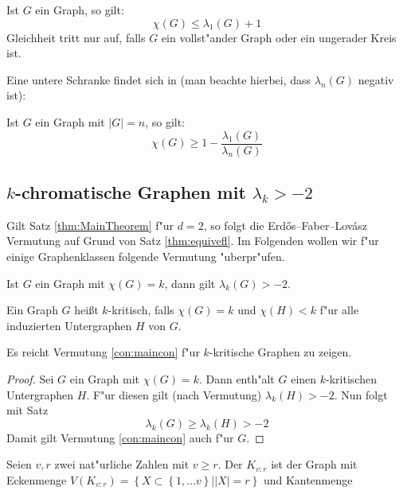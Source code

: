 \begin{theorem}
  Ist $G$ ein Graph, so gilt: 
  $$\chi(G) \leq \lambda_{1}(G) +1$$
  Gleichheit tritt nur auf, falls $G$ ein vollst"ander Graph oder ein ungerader Kreis ist.
  \label{thm:wilfev}
\end{theorem}

Eine untere Schranke findet sich in \cite{Hoffmanbounds} (man beachte hierbei, dass $\lambda_{n}(G)$ negativ ist):

\begin{theorem}
  Ist $G$ ein Graph mit $|G| = n$, so gilt:
  $$\chi(G) \geq 1 - \frac{\lambda_{1}(G)}{\lambda_{n}(G)}$$
  \label{thm:Hoffmanev}
\end{theorem}

\subsection{$k$-chromatische Graphen mit $\lambda_{k} > -2$}

Gilt Satz \ref{thm:MainTheorem} f"ur $d=2$, so folgt die Erd\H{o}s--Faber--Lov\'asz Vermutung auf Grund von Satz \ref{thm:equivefl}. Im Folgenden wollen wir f"ur einige Graphenklassen folgende Vermutung "uberpr"ufen.
\begin{conjecture}
  Ist $G$ ein Graph mit $\chi(G) = k$, dann gilt $\lambda_{k}(G) > -2$. 
  \label{con:maincon}
\end{conjecture}

Ein Graph $G$ hei{\ss}t $k$-kritisch, falls $\chi(G) = k$ und $\chi(H) < k$ f"ur alle induzierten Untergraphen $H$ von $G$.
\begin{remark}
  Es reicht Vermutung \ref{con:maincon} f"ur $k$-kritische Graphen zu zeigen. 
\end{remark}

\begin{proof}
  Sei $G$ ein Graph mit $\chi(G) = k$. Dann enth"alt $G$ einen $k$-kritischen Untergraphen $H$. F"ur diesen gilt (nach Vermutung) $\lambda_{k}(H) > -2$. Nun folgt mit Satz 
  \begin{equation*}
    \lambda_{k}(G) \geq \lambda_{k}(H) > -2
  \end{equation*}
  Damit gilt Vermutung \ref{con:maincon} auch f"ur $G$.
\end{proof}

Seien $v,r$ zwei nat"urliche Zahlen mit $v\geq r$. Der  $K_{v:r}$ ist der Graph mit Eckenmenge $V(K_{v:r}) = \left\{ X \subset \left\{ 1,\dots v \right\} | |X| = r \right\}$ und Kantenmenge 

